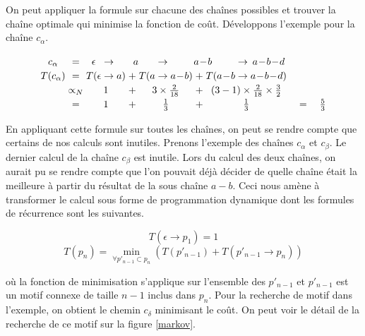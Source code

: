 On peut appliquer la formule sur chacune des chaînes possibles et trouver la chaîne optimale qui minimise la fonction de
coût. Développons l'exemple pour la chaîne $c_{\alpha}$.

\[
\arraycolsep=1.4pt\def\arraystretch{1.2}
\begin{array}{cccccccccccccc}
  c_\alpha    & =  & \epsilon &  \rightarrow &  \multicolumn{3}{c}{a} & \rightarrow & \multicolumn{3}{c}{a\!-\!b} &  \rightarrow & \multicolumn{1}{c}{a\!-\!b\!-\!d} &\\
  T(c_\alpha)   & =  & T( \epsilon &  \rightarrow &  a)  & + & T( a &  \rightarrow  & a\!-\!b) & + & T(a\!-\!b &  \rightarrow & a\!-\!b\!-\!d) &\\
                    & \propto_{N}  &  \multicolumn{3}{c}{1} &  + & \multicolumn{3}{c}{3 \times \frac{2}{18}} & + & \multicolumn{3}{c}{  (3-1)\times \frac{2}{18} \times \frac{3}{2}} &\\
                    & = &  \multicolumn{3}{c}{1} &  + & \multicolumn{3}{c}{\frac{1}{3}} & + & \multicolumn{3}{c}{\frac{1}{3}}   & \quad= \quad\frac{5}{3} \\

\end{array}
\]

En appliquant cette formule sur toutes les chaînes, on peut se rendre compte que certains de nos calculs sont inutiles.
Prenons l'exemple des chaînes $c_{\alpha}$ et $c_{\beta}$. Le dernier calcul de la chaîne $c_{\beta}$ est inutile. Lors
du calcul des deux chaînes, on aurait pu se rendre compte que l'on pouvait déjà décider de quelle chaîne était la meilleure à
partir du résultat de la sous chaîne $a-b$. Ceci nous amène à transformer le calcul sous forme de programmation dynamique dont les
formules de récurrence sont les suivantes.


\begin{equation}
 T(\epsilon \rightarrow p_1) = 1
\end{equation}
\begin{equation}
 T(p_n) = \min_{\forall p'_{n-1} \subset p_n} (T(p'_{n-1}) + T(p'_{n-1} \rightarrow p_n))
\end{equation}

où la fonction de minimisation s'applique sur l'ensemble des $p'_{n-1}$ et $p'_{n-1}$ est un motif connexe de taille $n-1$ inclus
dans $p_n$. Pour la recherche de motif dans l'exemple, on obtient le chemin $c_{\delta}$ minimisant le coût. On peut voir le
détail de la recherche de ce motif sur la figure \ref{markov}.

